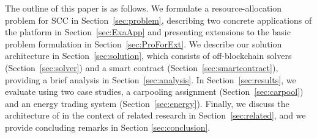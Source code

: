 The outline of this paper is as follows. We formulate a resource-allocation problem for SCC in Section~\ref{sec:problem},  describing two concrete  applications of the platform in Section~\ref{sec:ExaApp} and presenting extensions to the basic problem formulation in Section~\ref{sec:ProForExt}. We describe our solution architecture in Section~\ref{sec:solution}, which consists of off-blockchain solvers (Section~\ref{sec:solver}) and a smart contract (Section~\ref{sec:smartcontract}), providing a brief analysis in Section~\ref{sec:analysis}. In Section~\ref{sec:results}, we evaluate \Platform using two case studies, a carpooling assignment (Section~\ref{sec:carpool})
 and an energy trading system  (Section~\ref{sec:energy}). Finally, we discuss the architecture of \Platform in the context of related research in Section~\ref{sec:related},  and we provide concluding remarks in Section \ref{sec:conclusion}. 



